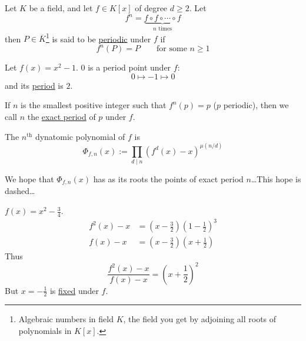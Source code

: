 \begin{definition}
    Let $K$ be a field, and let $f\in K[x]$ of degree $d\geq 2$. Let \[f^n = \underbrace{f\circ f\circ \cdots \circ f}_{n\text{ times}}\]
    then $P\in \overline{K}$\footnote{Algebraic numbers in field $K$, the field you get by adjoining all roots of polynomials in $K[x]$.} is said to be \ul{periodic} under $f$ if
    \[f^n(P) = P\qquad \text{for some $n\geq 1$}\]
\end{definition}
\begin{example}
    Let $f(x) = x^2 - 1$. $0$ is a period point under $f$:
    \[0\longmapsto -1\longmapsto 0\]
    and its \ul{period} is $2$.

    \begin{remark*}
        If $n$ is the smallest positive integer such that $f^n(p) = p$ ($p$ periodic), then we call $n$ the \ul{exact period} of $p$ under $f$.
    \end{remark*}
\end{example}
\begin{definition}
    The $n^\mathrm{th}$ dynatomic polynomial of $f$ is 
    \[\Phi_{f,n}(x) := \prod_{d\mid n}\left(f^d(x) - x\right)^{\mu(n/d)}\]
\end{definition}
We hope that $\Phi_{f, n}(x)$ has as its roots the points of exact period $n$\dots This hope is dashed\dots 
\begin{example}
    $f(x) = x^2 - \frac{3}{4}$. 
    \begin{align*}
        f^2(x) - x &= \left(x - \frac{3}{2}\right)\left(1 - \frac{1}{2}\right)^3 \\
        f(x) - x &= \left(x-\frac{3}{2}\right)\left(x + \frac{1}{2}\right)
    \end{align*}
    Thus \[\frac{f^2(x) - x}{f(x) - x} = \left(x + \frac{1}{2}\right)^2\]
    But $x=-\frac{1}{2}$ is \ul{fixed} under $f$. 
\end{example}